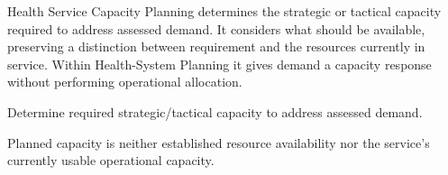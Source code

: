 Health Service Capacity Planning determines the strategic or tactical capacity required to address assessed demand. It considers what should be available, preserving a distinction between requirement and the resources currently in service. Within Health-System Planning it gives demand a capacity response without performing operational allocation.



Determine required strategic/\allowbreak{}tactical capacity to address assessed demand.



Planned capacity is neither established resource availability nor the service's currently usable operational capacity.


